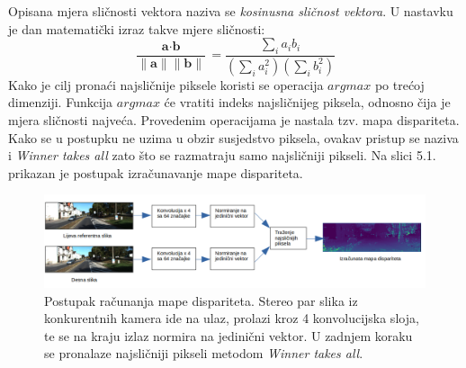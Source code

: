 \documentclass[times, utf8, zavrsni, numeric]{fer}
\begin{document}
Opisana mjera sličnosti vektora naziva se \textit{kosinusna sličnost vektora}. U nastavku je dan matematički izraz takve mjere sličnosti:
\begin{equation}
\frac{\textbf{a}\cdot\textbf{b}}{\parallel\textbf{a}\parallel \parallel\textbf{b}\parallel}=\frac{\sum_{i}a_{i}b_{i}}{(\sum_{i}a_{i}^2)(\sum_{i}b_{i}^2)}
\label{eq:normalizacija}
\end{equation}
Kako je cilj pronaći najsličnije piksele koristi se operacija $argmax$ po trećoj dimenziji. Funkcija $argmax$ će vratiti indeks najsličnijeg piksela, odnosno čija je mjera sličnosti najveća. Provedenim operacijama je nastala tzv. mapa dispariteta. Kako se u postupku ne uzima u obzir susjedstvo piksela, ovakav pristup se naziva i \textit{Winner takes all} zato što se razmatraju samo najsličniji pikseli. Na slici 5.1. prikazan je postupak izračunavanje mape dispariteta.
\begin{figure}[htb]
\centering
\includegraphics[width = 14.5cm]{img/disp_map.png}
\caption{Postupak računanja mape dispariteta. Stereo par slika iz konkurentnih kamera ide na ulaz, prolazi kroz 4 konvolucijska sloja, te se na kraju izlaz normira na jedinični vektor. U zadnjem koraku se pronalaze najsličniji pikseli metodom \textit{Winner takes all}.}
\label{fig:KITTI}
\end{figure}
\pagebreak
\end{document}
